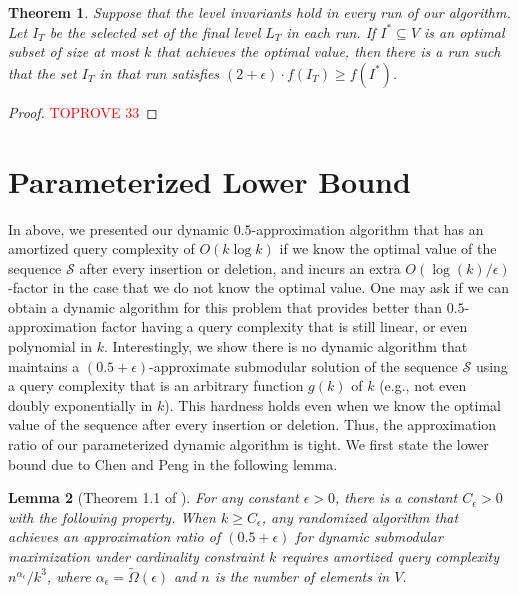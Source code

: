 \documentclass[11pt]{article}
\newtheorem{theorem}{Theorem}
\newtheorem{lemma}[theorem]{Lemma}
\newcommand{\mO}{O}
\begin{document}
\begin{theorem}
Suppose that the level invariants hold in every run of our algorithm.
Let $I_T$ be the selected set of the final level $L_T$ in each run. 
If $I^* \subseteq V$ is an optimal subset of size at most $k$ that achieves the optimal value, then there is a run such that the set $I_T$ in that run satisfies $(2 + \epsilon) \cdot f(I_T) \ge f(I^*)$.
\end{theorem}

\begin{proof}\textcolor{red}{TOPROVE 33}\end{proof}

 \section{Parameterized Lower Bound}
\label{sec:ower:bound}
In above, we presented our dynamic $0.5$-approximation algorithm that has an amortized query complexity of $\mO(k\log{k})$ 
if we know the optimal value of the sequence $\mathcal{S}$ after every insertion or deletion, and 
incurs an extra $\mO(\log(k)/\epsilon)$-factor in the case that we do not know the optimal value.
One may ask if we can obtain a dynamic algorithm for this problem that 
provides better than $0.5$-approximation factor having a query complexity that is still linear, or even polynomial in $k$.
Interestingly, we show there is no dynamic algorithm that maintains a $(0.5+\epsilon)$-approximate submodular solution of the sequence $\mathcal{S}$
using a query complexity that is an arbitrary function $g(k)$ of $k$ (e.g., not even doubly exponentially in $k$). 
This hardness holds even when we know the optimal value of the sequence after every insertion or deletion.   
Thus, the approximation ratio of our parameterized dynamic algorithm is tight.
We first state the lower bound due to Chen and Peng \cite[Theorem 1.1]{DBLP:journals/corr/abs-2111-03198} in 
the following lemma. 



\begin{lemma}[Theorem 1.1 of \cite{DBLP:journals/corr/abs-2111-03198}]
\label{lem:chen&peng:klogk}
For any constant $\epsilon>0$, there is a constant $C_{\epsilon}>0$ with the following property. 
 When $k \ge C_{\epsilon}$, any randomized algorithm that achieves an approximation ratio of 
 $(0.5+\epsilon)$ for dynamic submodular maximization under cardinality constraint $k$ 
requires amortized query complexity $n^{\alpha_{\epsilon}}/k^3$, where
$\alpha_{\epsilon} = \tilde{\Omega}(\epsilon)$ and $n$ is the number of elements in $V$. 
\end{lemma}
\end{document}
